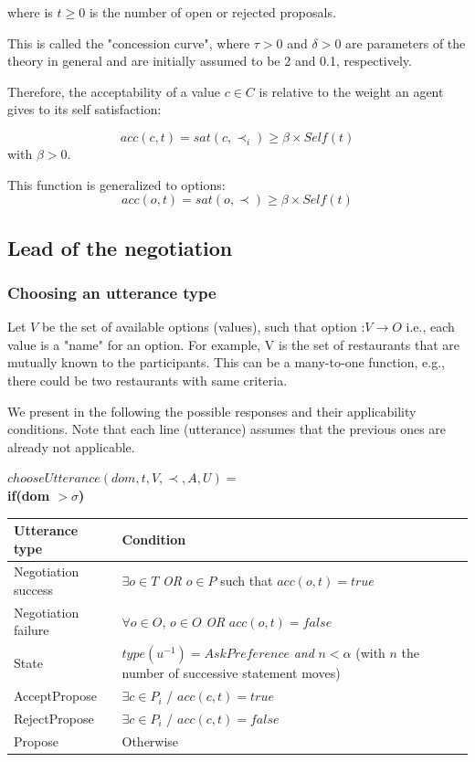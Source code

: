 \documentclass{llncs}
\begin{document}
				
				where is $t \geq 0$ is the number of open or rejected proposals.
				
				This is called the "concession curve", where $\tau > 0$ and $\delta > 0$
				are parameters of the theory in general and are initially assumed to
				be 2 and 0.1, respectively.
				
				Therefore, the acceptability of a value $c \in C$  is relative to the weight an agent gives to its self satisfaction:
				
				$$acc(c, t) = sat(c, \prec_i) \geq  \beta \times Self(t)$$
				with $\beta > 0 $.
				
				This function is generalized to options:
				$$acc(o, t) = sat(o, \prec) \geq  \beta \times Self(t)$$
				
				
				\subsection{Lead of the negotiation}
				
				
				\subsubsection{Choosing an utterance type}
				Let $V$ be the set of available options (values), such that option :$ V\rightarrow O$	i.e., each value is a "name" for an option.  For example, V is the set of restaurants that are mutually known to the participants. This can be a many-to-one function, e.g., there could be two restaurants with same criteria.		
				
				We present in the following the possible responses and their applicability conditions. Note that each line (utterance)  assumes that the previous ones are already not applicable.
				
				$ chooseUtterance(dom, t, V, \prec, A, U) = $ \\
				
				
				\textbf{if(\textbf{dom  $>\sigma$})} 
				\begin{table}
				\centering
			
				\begin{tabular}{|p{3cm}|p{9cm}|}
					\hline
					\textbf{Utterance type} & Condition \\
					\hline
					Negotiation success & $\exists o \in T$   \emph{OR} $o \in P$ such that  $acc(o,t) = true$ \\
					\hline
					Negotiation failure & $ \forall o \in O$,  $o \in O$  \emph{OR} $acc(o,t) = false$\\
					\hline
					State & $type(u^{-1}) = AskPreference$  \textit{ and }
					$n < \alpha$ (with $n$ the number of successive statement moves)\\
					\hline
					AcceptPropose & $\exists c \in P_i$ / $acc(c,t)= true$ \\
					\hline
					RejectPropose & $\exists c \in P_i$ / $acc(c,t)= false$ \\
					\hline
					Propose & Otherwise  \\
					
					\hline
				\end{tabular}
				\end{table}
		
\end{document}

